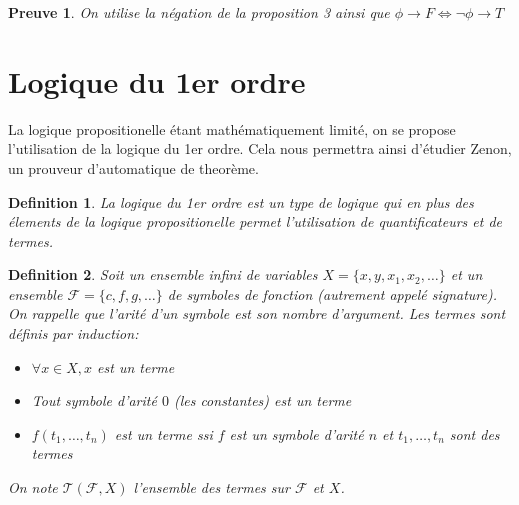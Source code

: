 \documentclass{paper}
\newtheorem{defi}{Definition}
\newtheorem{preuve}{Preuve}
\begin{document}
\begin{preuve}
    On utilise la négation de la proposition 3 ainsi que $\phi \rightarrow F \Leftrightarrow \lnot\phi \rightarrow T$  
\end{preuve}



























\section{Logique du 1er ordre}
La logique propositionelle étant mathématiquement limité, on se propose l'utilisation de la logique du 1er ordre.
Cela nous permettra ainsi d'étudier Zenon, un prouveur d'automatique de theorème.
\begin{defi}
    La \textit{logique du 1er ordre} est un type de logique qui en plus des élements de la logique propositionelle permet l'utilisation de
    quantificateurs et de \textit{termes}.
\end{defi}

\begin{defi}
    Soit un ensemble infini de variables $X = \{x,y,x_1,x_2,\dots \}$ et un ensemble $\mathcal{F}=\{c,f,g,\dots \}$ de symboles de fonction (autrement appelé signature).
    On rappelle que l'arité d'un symbole est son nombre d'argument.
    Les termes sont définis par induction:
    \begin{itemize}
        \item $\forall x\in X, x$ est un terme
        \item Tout symbole d'arité $0$ (les constantes) est un terme
        \item $f(t_1,\dots,t_n)$ est un terme ssi $f$ est un symbole d'arité $n$ et $t_1,\dots,t_n$ sont des termes
    \end{itemize} 
    On note $\mathcal{T}(\mathcal{F}, X)$ l'ensemble des termes sur $\mathcal{F}$ et $X$.
\end{defi}
\end{document}

